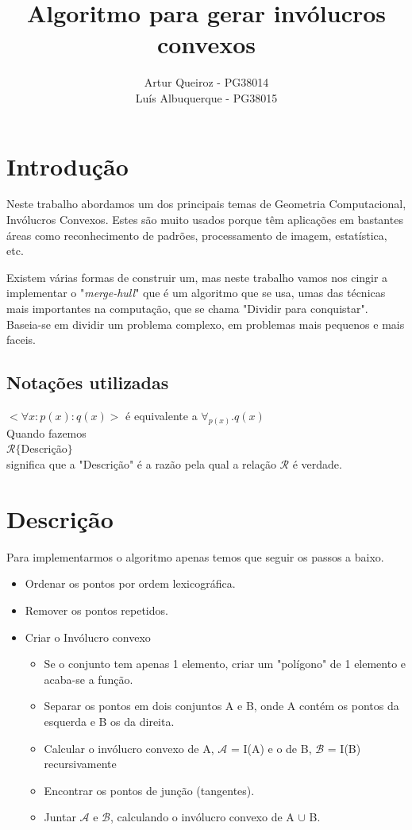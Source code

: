 \documentclass[11pt]{article}
\title{Algoritmo para gerar invólucros convexos}
\author{Artur Queiroz - PG38014\\Luís Albuquerque - PG38015}
\begin{document}
\maketitle

\section{Introdução}
Neste trabalho abordamos um dos principais temas de Geometria 
Computacional, Invólucros Convexos.
Estes são muito usados porque têm aplicações em bastantes áreas
como reconhecimento de padrões, processamento de imagem, 
estatística, etc.

Existem várias formas de construir um, mas neste trabalho vamos
nos cingir a implementar o "\textit{merge-hull}"
que é um algoritmo que se usa, umas das técnicas mais importantes
na computação, que se chama "Dividir para conquistar".
Baseia-se em dividir um problema complexo, em problemas mais 
pequenos e mais faceis.

\subsection{Notações utilizadas}
$<\forall x : p(x) : q(x)>$ é equivalente a $\forall_{p(x)} . q(x)$\\
Quando fazemos\\
$\mathcal{R}\{$Descrição$\}$\\
significa que a "Descrição" é a razão pela qual a relação $\mathcal{R}$
é verdade.


\section{Descrição}
Para implementarmos o algoritmo apenas temos que seguir os passos
a baixo.

\begin{itemize}
    \item Ordenar os pontos por ordem lexicográfica.
    \item Remover os pontos repetidos.
    \item Criar o Invólucro convexo
    \begin{itemize}
        \item Se o conjunto tem apenas 1 elemento, criar um "polígono"
            de 1 elemento e acaba-se a função.
        \item Separar os pontos em dois conjuntos A e B, 
            onde A contém os pontos da esquerda e B os da direita.
        \item Calcular o invólucro convexo de A, 
            $\mathcal{A}$ = I(A) e o de B, $\mathcal{B}$ = I(B) recursivamente
        \item Encontrar os pontos de junção (tangentes).
        \item Juntar $\mathcal{A}$ e $\mathcal{B}$, 
            calculando o invólucro convexo de A $\cup$ B.
    \end{itemize}
\end{itemize}
\end{document}
